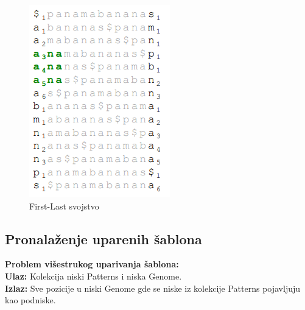 \begin{minipage}{\textwidth}
\begin{minipage}{0.45\textwidth}
\begin{figure}[H]
			\includegraphics[width=\textwidth]{poglavlja/9/slike/traziAnukraj2.png}
			\caption{First-Last svojstvo}
			\label{ana2}
		\end{figure}  
	\end{minipage}
	\vspace*{1em}
\end{minipage}


\subsection{Pronalaženje uparenih šablona}

\begin{tcolorbox}
\textbf{Problem višestrukog uparivanja šablona:}\\
\textbf{Ulaz:} Kolekcija niski Patterns i niska Genome.\\
\textbf{Izlaz:} Sve pozicije u niski Genome gde se niske iz kolekcije Patterns pojavljuju kao podniske.
\end{tcolorbox}


